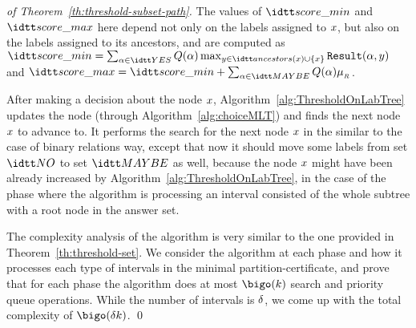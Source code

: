 \begin{PROOF}
\begin{proof}[of Theorem~\ref{th:threshold-subset-path}]
  The values of $\scoremin$ and $\scoremax$ here depend not only on
  the labels assigned to $x$, but also on the labels assigned to
  its ancestors, and are computed as $\scoremin = \sum_{ \labelx \in
    \setYES} \Q( \labelx) \max_{ \nodey \in \ancestors(x) \cup\{
    \nodex\}}{ \R(\labelx, \nodey)}$ and $\scoremax = \scoremin +
  \sum_{ \labelx \in \setMAYBE} \Q( \labelx) \maxWeightR$.

  After making a decision about the node $x$,
  Algorithm~\ref{alg:ThresholdOnLabTree} updates the node (through
  Algorithm~\ref{alg:choiceMLT}) and finds the next node $x$ to
  advance to. It performs the search for the next node $x$ in the
  similar to the case of binary relations way, except that now it
  should move some labels from set $\setNO$ to set $\setMAYBE$ as
  well, because the node $x$ might have been already increased by
  Algorithm~\ref{alg:ThresholdOnLabTree}, in the case of the phase
  where the algorithm is processing an interval consisted of the whole
  subtree with a root node in the answer set.



  The complexity analysis of the algorithm is very similar to the one
  provided in Theorem~\ref{th:threshold-set}. We consider the
  algorithm at each phase and how it processes each type of intervals
  in the minimal partition-certificate, and prove that for each phase
  the algorithm does at most $\bigo(\nbkeywords)$ search and priority
  queue operations. While the number of intervals is $\delta$, we
  come up with the total complexity of $\bigo(\difficulty
  \nbkeywords)$.  \qed
\end{proof}
\end{PROOF}

